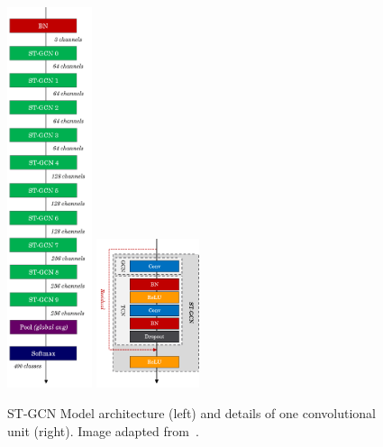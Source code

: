 \begin{figure}[ht]
    \centering
    \includegraphics[width=2.5cm]{images/st_gcn_architecture}
    \includegraphics[width=3.0cm]{images/st_gcn_architeture_unit}
    \caption{ST-GCN Model architecture (left) and details of one convolutional unit (right). Image adapted from~\cite{st-gcn-2018}.}
    \label{fig:st-gcn-architecture}
\end{figure}

